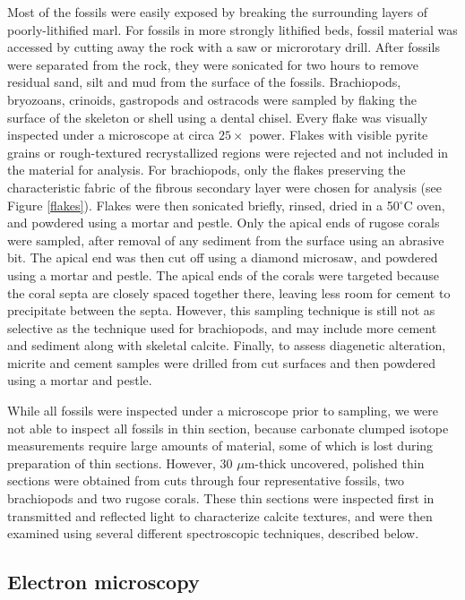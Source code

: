 \documentclass{article}
\newcommand{\degrees}{$^{\circ}$}
\begin{document}
Most of the fossils were easily exposed by breaking the surrounding layers of poorly-lithified marl. For fossils in more strongly lithified beds, fossil material was accessed by cutting away the rock with a saw or microrotary drill. After fossils were separated from the rock, they were sonicated for two hours to remove residual sand, silt and mud from the surface of the fossils. Brachiopods, bryozoans, crinoids, gastropods and ostracods were sampled by flaking the surface of the skeleton or shell using a dental chisel. Every flake was visually inspected under a microscope at circa $25\times$ power. Flakes with visible pyrite grains or rough-textured recrystallized regions were rejected and not included in the material for analysis. For brachiopods, only the flakes preserving the characteristic fabric of the fibrous secondary layer were chosen for analysis (see Figure \ref{flakes}). Flakes were then sonicated briefly, rinsed, dried in a 50\degrees C oven, and powdered using a mortar and pestle. Only the apical ends of rugose corals were sampled, after removal of any sediment from the surface using an abrasive bit. The apical end was then cut off using a diamond microsaw, and powdered using a mortar and pestle. The apical ends of the corals were targeted because the coral septa are closely spaced together there, leaving less room for cement to precipitate between the septa. However, this sampling technique is still not as selective as the technique used for brachiopods, and may include more cement and sediment along with skeletal calcite. Finally, to assess diagenetic alteration, micrite and cement samples were drilled from cut surfaces and then powdered using a mortar and pestle. 

While all fossils were inspected under a microscope prior to sampling, we were not able to inspect all fossils in thin section, because carbonate clumped isotope measurements require large amounts of material, some of which is lost during preparation of thin sections. However, 30 $\mu$m-thick uncovered, polished thin sections were obtained from cuts through four representative fossils, two brachiopods and two rugose corals. These thin sections were inspected first in transmitted and reflected light to characterize calcite textures, and were then examined using several different spectroscopic techniques, described below. 

\subsection{Electron microscopy}
\end{document}
